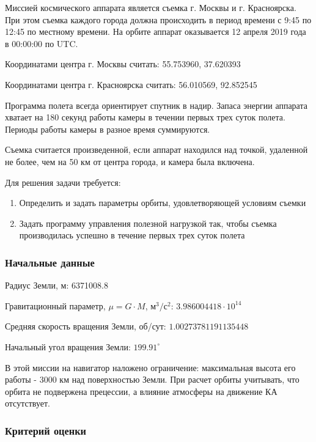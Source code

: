 
Миссией космического аппарата является съемка г. Москвы и г. Красноярска. При этом съемка каждого города должна происходить в период времени с 9:45 по 12:45 по местному времени. На орбите аппарат оказывается 12 апреля 2019 года в 00:00:00 по UTC.

Координатами центра г. Москвы считать: 55.753960,  37.620393

Координатами центра г. Красноярска считать: 56.010569, 92.852545

Программа полета всегда ориентирует спутник в надир. Запаса энергии аппарата хватает на 180 секунд работы камеры в течении первых трех суток полета. Периоды работы камеры в разное время суммируются.

Съемка считается произведенной, если аппарат находился над точкой, удаленной не более, чем на 50 км от центра города, и камера была включена.

Для решения задачи требуется:


\begin{enumerate}
    \item Определить и задать параметры орбиты, удовлетворяющей условиям съемки
    \item Задать программу управления полезной нагрузкой так, чтобы съемка производилась успешно в течение первых трех суток полета    
\end{enumerate}

\subsubsection*{Начальные данные}

Радиус Земли, м: 6371008.8

Гравитационный параметр, $\mu = G \cdot M$, м$^3/$с$^2$: $3.986004418 \cdot 10^{14}$

Средняя скорость вращения Земли, об/сут: $1.00273781191135448$

Начальный угол вращения Земли: $199.91^{\circ}$


В этой миссии на навигатор наложено ограничение: максимальная высота его работы - 3000 км над поверхностью Земли. При расчет орбиты учитывать, что орбита не подвержена прецессии, а влияние атмосферы на движение КА отсутствует.

\subsubsection*{Критерий оценки}

